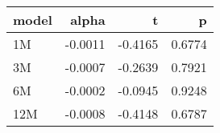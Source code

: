 \begin{table}[ht]
\centering
\begin{tabular}{lrrr}
  \hline
model & alpha & t & p \\ 
  \hline
1M & -0.0011 & -0.4165 & 0.6774 \\ 
  3M & -0.0007 & -0.2639 & 0.7921 \\ 
  6M & -0.0002 & -0.0945 & 0.9248 \\ 
  12M & -0.0008 & -0.4148 & 0.6787 \\ 
   \hline
\end{tabular}
\end{table}

